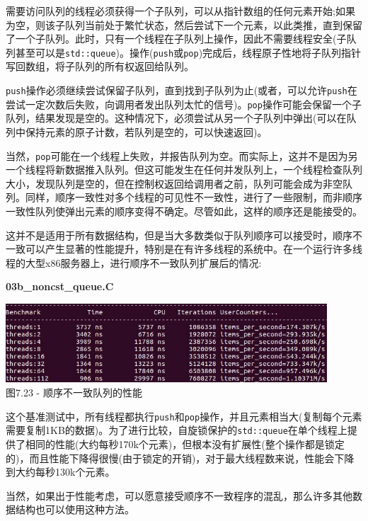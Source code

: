 需要访问队列的线程必须获得一个子队列，可以从指针数组的任何元素开始;如果为空，则该子队列当前处于繁忙状态，然后尝试下一个元素，以此类推，直到保留了一个子队列。此时，只有一个线程在子队列上操作，因此不需要线程安全(子队列甚至可以是\texttt{std::queue})。操作(\texttt{push}或\texttt{pop})完成后，线程原子性地将子队列指针写回数组，将子队列的所有权返回给队列。

\texttt{push}操作必须继续尝试保留子队列，直到找到子队列为止(或者，可以允许\texttt{push}在尝试一定次数后失败，向调用者发出队列太忙的信号)。\texttt{pop}操作可能会保留一个子队列，结果发现是空的。这种情况下，必须尝试从另一个子队列中弹出(可以在队列中保持元素的原子计数，若队列是空的，可以快速返回)。

当然，\texttt{pop}可能在一个线程上失败，并报告队列为空。而实际上，这并不是因为另一个线程将新数据推入队列。但这可能发生在任何并发队列上，一个线程检查队列大小，发现队列是空的，但在控制权返回给调用者之前，队列可能会成为非空队列。同样，顺序一致性对多个线程的可见性不一致性，进行了一些限制，而非顺序一致性队列使弹出元素的顺序变得不确定。尽管如此，这样的顺序还是能接受的。

这并不是适用于所有数据结构，但是当大多数类似于队列顺序可以接受时，顺序不一致可以产生显著的性能提升，特别是在有许多线程的系统中。在一个运行许多线程的大型x86服务器上，进行顺序不一致队列扩展后的情况:

\noindent
\textbf{03b\_noncst\_queue.C}
\begin{center}
\includegraphics[width=0.9\textwidth]{content/2/chapter7/images/23.jpg}\\
图7.23 - 顺序不一致队列的性能
\end{center}

这个基准测试中，所有线程都执行\texttt{push}和\texttt{pop}操作，并且元素相当大(复制每个元素需要复制1KB的数据)。为了进行比较，自旋锁保护的\texttt{std::queue}在单个线程上提供了相同的性能(大约每秒170k个元素)，但根本没有扩展性(整个操作都是锁定的)，而且性能下降得很慢(由于锁定的开销)，对于最大线程数来说，性能会下降到大约每秒130k个元素。

当然，如果出于性能考虑，可以愿意接受顺序不一致程序的混乱，那么许多其他数据结构也可以使用这种方法。

